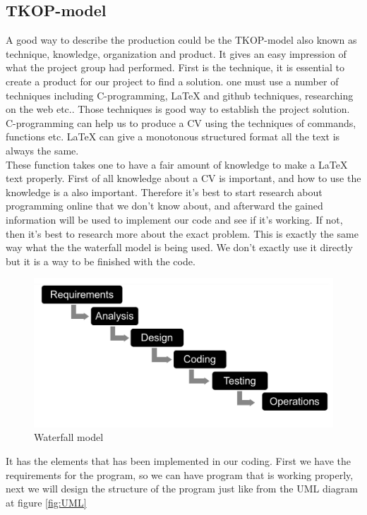 \subsection{TKOP-model}
A good way to describe the production could be the TKOP-model also known as technique, knowledge, organization and product.
It gives an easy impression of what the project group had performed.
First is the technique, it is essential to create a product for our project to find a solution. 
one must use a number of techniques including C-programming, LaTeX and github techniques, researching on the web etc..
Those techniques is good way to establish the project solution. C-programming can help us to produce a CV using the techniques
of commands, functions etc. LaTeX can give a monotonous structured format all the text is always the same. \\

These function takes one to have a fair amount of knowledge to make a LaTeX text properly.
First of all knowledge about a CV is important, and how to use the knowledge is a also important.
Therefore it's best to start research about programming online that we don't know about, 
and afterward the gained information will be used to implement our code and see if it's working. 
If not, then it's best to research more about the exact problem.
This is exactly the same way what the the waterfall model is being used.
We don't exactly use it directly but it is a way to be finished with the code.
\begin{figure}[H]
  \centering
  \includegraphics[scale = 0.2]{figures/vandfald}
  \caption{Waterfall model \cite{Waterfall_model}}
\end{figure}

It has the elements that has been implemented in our coding. First we have the requirements for the program, 
so we can have program that is working properly, 
next we will design the structure of the program just like from the UML diagram at figure \vref{fig:UML}
 
